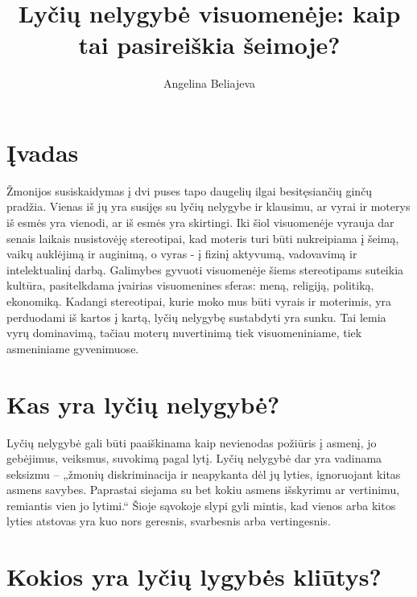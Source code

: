 \documentclass[titlepage, 11pt]{article}
\title{Lyčių nelygybė visuomenėje: kaip tai pasireiškia šeimoje?}
\author{Angelina Beliajeva}
\begin{document}
\maketitle
\tableofcontents
\newpage
\section{Įvadas}

Žmonijos susiskaidymas į dvi puses tapo daugelių ilgai besitęsiančių ginčų pradžia. Vienas iš jų yra susijęs su lyčių nelygybe ir klausimu, ar vyrai ir moterys iš esmės yra vienodi, ar iš esmės yra skirtingi. Iki šiol visuomenėje vyrauja dar senais laikais nusistovėję stereotipai, kad moteris turi būti nukreipiama į šeimą, vaikų auklėjimą ir auginimą, o vyras - į fizinį aktyvumą, vadovavimą ir intelektualinį darbą. Galimybes gyvuoti visuomenėje šiems stereotipams suteikia kultūra, pasitelkdama įvairias visuomenines sferas: meną, religiją, politiką, ekonomiką. Kadangi stereotipai, kurie moko mus būti vyrais ir moterimis, yra perduodami iš kartos į kartą, lyčių nelygybę sustabdyti yra sunku. Tai lemia vyrų dominavimą, tačiau moterų nuvertinimą tiek visuomeniniame, tiek asmeniniame gyvenimuose.

\section{Kas yra lyčių nelygybė?}

Lyčių nelygybė gali būti paaiškinama kaip nevienodas požiūris į asmenį, jo gebėjimus, veiksmus, suvokimą pagal lytį. Lyčių nelygybė dar yra vadinama seksizmu – „žmonių diskriminacija ir neapykanta dėl jų lyties, ignoruojant kitas asmens savybes. Paprastai siejama su bet kokiu asmens išskyrimu ar vertinimu, remiantis vien jo lytimi.“ Šioje sąvokoje slypi gyli mintis, kad vienos arba kitos lyties atstovas yra kuo nors geresnis, svarbesnis arba vertingesnis.

\section{Kokios yra lyčių lygybės kliūtys?}
\end{document}
